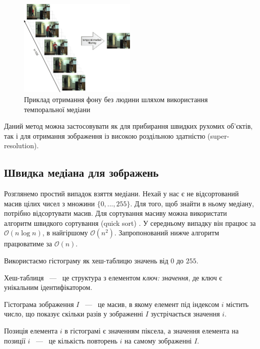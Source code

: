 \begin{figure}[H]
    \centering
    \includegraphics[width=0.5\textwidth]{images/temporal_median_example_1}
    \caption{Приклад отримання фону без людини шляхом використання темпоральної медіани
        \cite{temporal_median_example_1}
        \label{fig:temporal_median_example_1}
    }
\end{figure}
Даний метод можна застосовувати як для прибирання швидких рухомих об'єктів,
так і для  отримання зображення із високою роздільною здатністю (super-resolution).

\subsection{Швидка медіана для зображень}

Розглянемо простий випадок взяття медіани.
Нехай у нас є не відсортований масив цілих чисел з множини $\{0,..., 255\}$.
Для того, щоб знайти в ньому медіану, потрібно відсортувати масив.
Для сортування масиву можна використати алгоритм швидкого сортування (quick sort)
\cite{quick_sort}. У середньому випадку він працює за $\mathcal{O}(n\log{}n)$, в
найгіршому $\mathcal{O}(n^2)$.
Запропонований нижче алгоритм працюватиме за $\mathcal{O}(n)$.

Використаємо гістограму як хеш-таблицю  значень від $0$ до $255$.
\begin{definition}
    Хеш-таблиця ~---~ це структура з елементом \textit{{ключ: значення}}, де
    ключ є унікальним ідентифікатором.
\end{definition}

\begin{definition}
    Гістограма зображення $I$ ~---~ це масив, в якому елемент під індексом $i$ містить число, що показує скільки
    разів у зображенні $I$ зустрічається значення $i$.
\end{definition}

Позиція елемента $i$ в гістограмі є значенням піксела, а значення елемента на позиції $i$ ~---~ це
кількість повторень $i$ на самому зображенні $I$.

